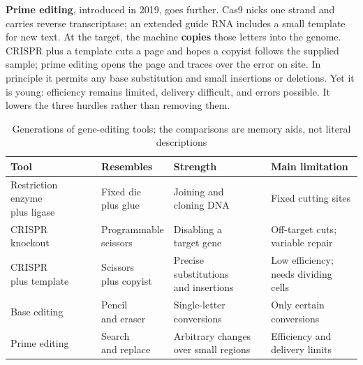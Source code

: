\textbf{Prime editing}, introduced in 2019, goes further. Cas9 nicks one strand and carries reverse transcriptase; an extended guide RNA includes a small template for new text. At the target, the machine \textbf{copies} those letters into the genome. CRISPR plus a template cuts a page and hopes a copyist follows the supplied sample; prime editing opens the page and traces over the error on site. In principle it permits any base substitution and small insertions or deletions. Yet it is young: efficiency remains limited, delivery difficult, and errors possible. It lowers the three hurdles rather than removing them.

\begin{table}[htbp]
\centering
\caption{Generations of gene-editing tools; the comparisons are memory aids, not literal descriptions}
\begin{tabular}{llll}
\toprule
Tool & Resembles & Strength & Main limitation \\
\midrule
\shortstack[l]{Restriction enzyme\\plus ligase} & \shortstack[l]{Fixed die\\plus glue} & \shortstack[l]{Joining and\\cloning DNA} & Fixed cutting sites \\
\shortstack[l]{CRISPR\\knockout} & \shortstack[l]{Programmable\\scissors} & \shortstack[l]{Disabling a\\target gene} & \shortstack[l]{Off-target cuts;\\variable repair} \\
\shortstack[l]{CRISPR\\plus template} & \shortstack[l]{Scissors\\plus copyist} & \shortstack[l]{Precise substitutions\\and insertions} & \shortstack[l]{Low efficiency;\\needs dividing cells} \\
Base editing & \shortstack[l]{Pencil\\and eraser} & \shortstack[l]{Single-letter\\conversions} & \shortstack[l]{Only certain\\conversions} \\
Prime editing & \shortstack[l]{Search\\and replace} & \shortstack[l]{Arbitrary changes\\over small regions} & \shortstack[l]{Efficiency and\\delivery limits} \\
\bottomrule
\end{tabular}
\end{table}

